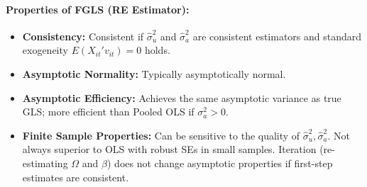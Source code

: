 \documentclass[a4paper, 10pt]{article}
\theoremstyle{definition}	%
\begin{document}
\paragraph{Properties of FGLS (RE Estimator):}
\begin{itemize}
    \item \textbf{Consistency:} Consistent if \(\hat{\sigma}_u^2\) and \(\hat{\sigma}_a^2\) are consistent estimators and standard exogeneity \(E(X_{it}'v_{it})=0\) holds.
    \item \textbf{Asymptotic Normality:} Typically asymptotically normal.
    \item \textbf{Asymptotic Efficiency:} Achieves the same asymptotic variance as true GLS; more efficient than Pooled OLS if \(\sigma_a^2 > 0\).
    \item \textbf{Finite Sample Properties:} Can be sensitive to the quality of \(\hat{\sigma}_u^2, \hat{\sigma}_a^2\). Not always superior to OLS with robust SEs in small samples. Iteration (re-estimating \(\Omega\) and \(\beta\)) does not change asymptotic properties if first-step estimates are consistent.
\end{itemize}
\end{document}
